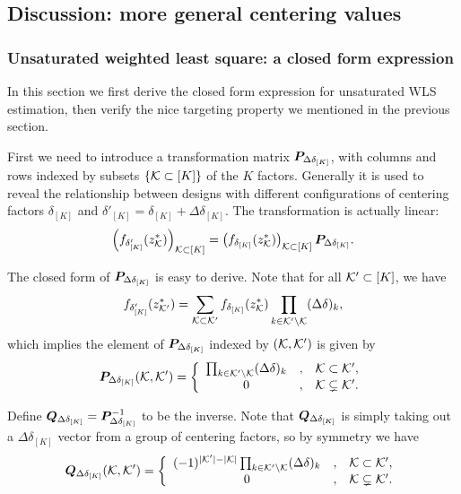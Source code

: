 \documentclass[12pt]{article}
\begin{document}
\subsection{Discussion: more general centering values}

\subsubsection{Unsaturated weighted least square: a closed form expression}

In this section we first derive the closed form expression for unsaturated WLS estimation, then verify the nice targeting property we mentioned in the previous section. 

First we need to introduce a transformation matrix ${\boldsymbol{P}}_{\Delta\delta_{[K]}}$, with columns and rows indexed by subsets $\{{\mathcal{K}}\subset [K]\}$ of the $K$ factors. Generally it is used to reveal the relationship between designs with different configurations of centering factors $\delta_{[K]}$ and $\delta'_{[K]} = \delta_{[K]}+\Delta\delta_{[K]}$. The transformation is actually linear:
\begin{align}
    \left(f_{\delta'_{[K]}}(z^*_{\mathcal{K}})\right)_{{\mathcal{K}}\subset [K]} = \left(f_{\delta_{[K]}}(z^*_{\mathcal{K}})\right)_{{\mathcal{K}}\subset [K]} {\boldsymbol{P}}_{\Delta\delta_{[K]}}.
\end{align}

The closed form of ${\boldsymbol{P}}_{\Delta\delta_{[K]}}$ is easy to derive.  Note that for all ${\mathcal{K}}'\subset [K]$, we have 
\begin{align}
    f_{\delta'_{[K]}}(z^*_{{\mathcal{K}}'}) = \sum_{{\mathcal{K}}\subset {\mathcal{K}}'}f_{\delta_{[K]}}(z^*_{{\mathcal{K}}}) \prod_{k\in {\mathcal{K}}'\backslash {\mathcal{K}}}(\Delta\delta)_k, \notag
\end{align}
which implies the element of ${\boldsymbol{P}}_{\Delta\delta_{[K]}}$ indexed by $({\mathcal{K}}, {\mathcal{K}}')$ is given by
\begin{align}\label{eqn:Pmatrix}
{\boldsymbol{P}}_{\Delta\delta_{[K]}}({\mathcal{K}},{\mathcal{K}}')=\left\{
\begin{array}{ccc}
    \prod_{k\in {\mathcal{K}}'\backslash {\mathcal{K}}}(\Delta\delta)_k &, & {\mathcal{K}}\subset{\mathcal{K}}', \\
     0 &, & {\mathcal{K}}\subsetneq {\mathcal{K}}'. 
\end{array}
\right.
\end{align}

Define ${\boldsymbol{Q}}_{\Delta\delta_{[K]}} = {\boldsymbol{P}}_{\Delta\delta_{[K]}}^{-1}$ to be the inverse. Note that ${\boldsymbol{Q}}_{\Delta\delta_{[K]}}$ is simply taking out a $\Delta\delta_{[K]}$ vector from a group of centering factors, so by symmetry we have 
\begin{align}\label{eqn:Qmatrix}
    {\boldsymbol{Q}}_{\Delta\delta_{[K]}}({\mathcal{K}},{\mathcal{K}}') = \left\{
\begin{array}{ccc}
    (-1)^{|{\mathcal{K}}'|-|{\mathcal{K}}|}\prod_{k\in {\mathcal{K}}'\backslash {\mathcal{K}}}(\Delta\delta)_k &, & {\mathcal{K}}\subset{\mathcal{K}}', \\
     0 &, & {\mathcal{K}}\subsetneq {\mathcal{K}}'. 
\end{array}
\right.
\end{align}
\end{document}

